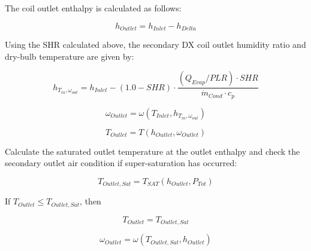 The coil outlet enthalpy is calculated as follows:

\begin{equation}
  h_{Outlet} = h_{Inlet}-h_{Delta}
\end{equation}

Using the SHR calculated above, the secondary DX coil outlet humidity ratio and dry-bulb temperature are given by:

\begin{equation}
  h_{T_{in},\omega_{out}} = h_{Inlet} - \left(1.0 - SHR\right) \cdot \frac{\left(Q_{Evap}/PLR\right)\cdot SHR}{\dot{m}_{Cond}\cdot c_p}
\end{equation}

\begin{equation}
  \omega_{Outlet} = \omega( T_{Inlet}, h_{T_{in},\omega_{out}} )
\end{equation}

\begin{equation}
  T_{Outlet} = T( h_{Outlet}, \omega_{Outlet} )
\end{equation}

Calculate the saturated outlet temperature at the outlet enthalpy and check the secondary outlet air condition if super-saturation has occurred:

\begin{equation}
  T_{Outlet, Sat} = T_{SAT}\left(h_{Outlet}, P_{Tot}\right)
\end{equation}

If \(T_{Outlet} \leq T_{Outlet, Sat}\), then

\begin{equation}
  T_{Outlet} = T_{Outlet, Sat}
\end{equation}

\begin{equation}
  \omega_{Outlet} = \omega\left(T_{Outlet,Sat},h_{Outlet}\right)
\end{equation}

